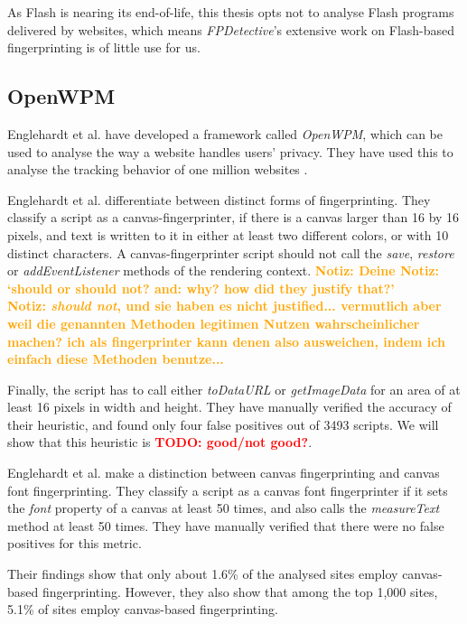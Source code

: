 \documentclass[
    fontsize=12pt,
    headings=small,
    parskip=half,
    bibliography=totoc,
    numbers=noenddot,
    open=any
    ]{scrreprt}
\newcommand{\dominik}[1]{\textcolor{orange}{\textbf{Notiz: #1}}}
\newcommand{\todo}[1]{\textcolor{red}{\textbf{TODO: #1}}}
\begin{document}
As Flash is nearing its end-of-life, this thesis opts not to analyse Flash programs
delivered by websites, which means \textit{FPDetective}'s extensive work on Flash-based fingerprinting
is of little use for us.


\subsection{OpenWPM}
\label{section:openwpm}
Englehardt et al. have developed a framework called \textit{OpenWPM}, which can be used to analyse the way a website
handles users' privacy. They have used this to analyse the tracking behavior of one million websites
\cite{DBLP:conf/ccs/EnglehardtN16,englehardt2016census}.

Englehardt et al. differentiate between distinct forms of fingerprinting.
They classify a script as a canvas-fingerprinter, if there is a canvas larger than 16 by 16 pixels, and text is
written to it in either at least two different colors, or with 10 distinct characters.
A canvas-fingerprinter script should not call the \textit{save}, \textit{restore} or \textit{addEventListener}
methods of the rendering context.
\dominik{Deine Notiz: `should or should not? and: why? how did they justify that?'}\\
\dominik{\textit{should not}, und sie haben es nicht justified... vermutlich aber weil die genannten Methoden legitimen Nutzen wahrscheinlicher machen? ich als fingerprinter kann denen also ausweichen, indem ich einfach diese Methoden benutze...}

Finally, the script has to call either \textit{toDataURL}
or \textit{getImageData} for an area of at least 16 pixels in width and height.
They have manually verified the accuracy of their heuristic, and found only four false positives
out of 3493 scripts.
We will show that this heuristic is \todo{good/not good?}.

Englehardt et al. make a distinction between canvas fingerprinting and canvas font fingerprinting.
They classify a script as a canvas font fingerprinter if it sets the \textit{font} property
of a canvas at least 50 times, and also calls the \textit{measureText} method at least 50 times.
They have manually verified that there were no false positives for this metric.

Their findings show that only about 1.6\% of the analysed sites
employ canvas-based fingerprinting. However, they also show that among the top 1,000 sites,
5.1\% of sites employ canvas-based fingerprinting.
\end{document}
